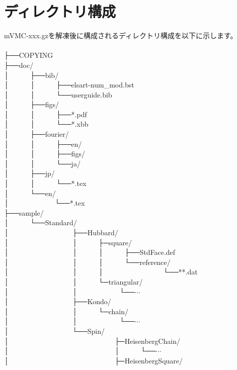 \section{ディレクトリ構成}
mVMC-xxx.gzを解凍後に構成されるディレクトリ構成を以下に示します。\\
\\
├──COPYING\\
├──doc/\\
│~~~~~~├──bib/\\
│~~~~~~│~~~~~~├──elsart-num\_mod.bst\\
│~~~~~~│~~~~~~└──userguide.bib\\
│~~~~~~├──figs/\\
│~~~~~~│~~~~~~├──*.pdf\\
│~~~~~~│~~~~~~└──*.xbb\\
│~~~~~~├──fourier/\\
│~~~~~~│~~~~~~├──en/\\
│~~~~~~│~~~~~~├──figs/\\
│~~~~~~│~~~~~~└──ja/\\
│~~~~~~├──jp/\\
│~~~~~~│~~~~~~└──*.tex\\
│~~~~~~└──en/\\
│~~~~~~~~~~~~~└──*.tex\\
├──sample/\\
│~~~~~~└──Standard/\\
│~~~~~~~~~~~~~~~~~~├──Hubbard/\\
│~~~~~~~~~~~~~~~~~~│~~~~~~├─square/\\
│~~~~~~~~~~~~~~~~~~│~~~~~~│~~~~~~├──StdFace.def\\
│~~~~~~~~~~~~~~~~~~│~~~~~~│~~~~~~└──reference/\\
│~~~~~~~~~~~~~~~~~~│~~~~~~│~~~~~~~~~~~~~~~~~└──**.dat\\
│~~~~~~~~~~~~~~~~~~│~~~~~~└─triangular/\\
│~~~~~~~~~~~~~~~~~~│~~~~~~~~~~~~└──$\cdots$\\
│~~~~~~~~~~~~~~~~~~├──Kondo/\\
│~~~~~~~~~~~~~~~~~~│~~~~~~└─chain/\\
│~~~~~~~~~~~~~~~~~~│~~~~~~~~~~~~└──$\cdots$\\
│~~~~~~~~~~~~~~~~~~└──Spin/\\
│~~~~~~~~~~~~~~~~~~~~~~~~~~~~~~├─HeisenbergChain/\\
│~~~~~~~~~~~~~~~~~~~~~~~~~~~~~~│~~~~~~└──$\cdots$\\
│~~~~~~~~~~~~~~~~~~~~~~~~~~~~~~├─HeisenbergSquare/\\
